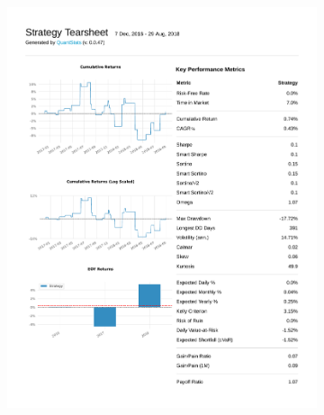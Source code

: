 \documentclass[12pt,a4paper]{article}
\begin{document}
\begin{figure}[ht!]
\begin{subfigure}[ht!]{0.45\textwidth}
    \includegraphics[page=2, width=\textwidth]{plots/qs_ppo.pdf}
  \end{subfigure}
  \begin{subfigure}[ht!]{0.45\textwidth}

\end{subfigure}
\end{figure}
\end{document}

